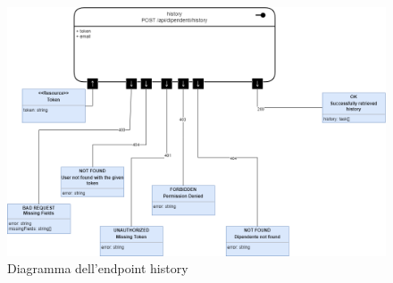 \documentclass{report}
\begin{document}
\begin{figure}[H]
	\centering\includegraphics[width=1\textwidth]{images/microservizio-dipendenti/diagrams/history_diagram.drawio.png}
	\caption{Diagramma dell'endpoint history}
\end{figure}
\end{document}
